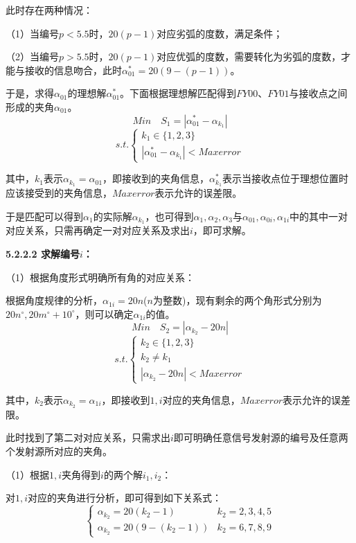 \documentclass[12pt]{ctexart}
\begin{document}
\begin{spacing}{1.5}
此时存在两种情况：

（1）当编号$p<5.5$时，$20(p-1)$对应劣弧的度数，满足条件；

（2）当编号$p>5.5$时，$20(p-1)$对应优弧的度数，需要转化为劣弧的度数，才能与接收的信息吻合，此时$\alpha_{01}^{*}=20(9-(p-1))$。

于是，求得$\alpha_{01}$的理想解$\alpha_{01}^{*}$。下面根据理想解匹配得到$FY00$、$FY01$与接收点之间形成的夹角$\alpha_{01}$。
$$ Min \quad S_1=|\alpha_{01}^{*}-\alpha_{k_1}| $$
\begin{equation}
	s.t.
	\begin{cases}
		k_1\in{\{1,2,3\}}	\\
		|\alpha_{01}^{*}-\alpha_{k_1}|<Maxerror
	\end{cases}
\end{equation}

其中，$k_1$表示$\alpha_{k_1}=\alpha_{01}$，即接收到的夹角信息，$\alpha_{k_1}^{*}$表示当接收点位于理想位置时应该接受到的夹角信息，$Maxerror$表示允许的误差限。

于是匹配可以得到$\alpha_{1}$的实际解$\alpha_{k_1}$，也可得到$\alpha_{1},\alpha_{2},\alpha_{3}$与$\alpha_{01},\alpha_{0i},\alpha_{1i}$中的其中一对对应关系，只需再确定一对对应关系及求出$i$，即可求解。

\textbf{5.2.2.2 求解编号$i$：}

（1）根据角度形式明确所有角的对应关系：

根据角度规律的分析，$\alpha_{1i}=20n$($n$为整数)，现有剩余的两个角形式分别为$20n^{\circ},20m^{\circ}+10^{\circ}$，则可以确定$\alpha_{1i}$的值。
$$ Min \quad S_2=|\alpha_{k_2}-20n| $$
\begin{equation}
	s.t.
	\begin{cases}
		k_2\in{\{1,2,3\}}	\\
		k_2\neq k_1 \\
		|\alpha_{k_2}-20n|<Maxerror
	\end{cases}
\end{equation}

其中，$k_2$表示$\alpha_{k_2}=\alpha_{1i}$，即接收到$1,i$对应的夹角信息，$Maxerror$表示允许的误差限。

此时找到了第二对对应关系，只需求出$i$即可明确任意信号发射源的编号及任意两个发射源所对应的夹角。

（1）根据$1,i$夹角得到$i$的两个解$i_1,i_2$：

对$1,i$对应的夹角进行分析，即可得到如下关系式：
\begin{equation}
	\begin{cases}
		\alpha_{k_2}=20(k_2-1)	   & k_2=2,3,4,5\\
		\alpha_{k_2}=20(9-(k_2-1)) & k_2=6,7,8,9
	\end{cases}
\end{equation}


\end{spacing}
\end{document}

